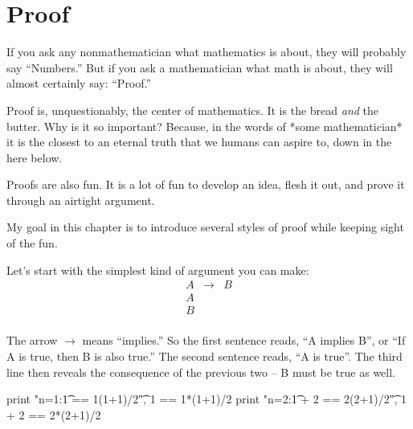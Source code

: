 \chapter{Proof}

If you ask any nonmathematician what mathematics is about, they will
probably say ``Numbers.''  But if you ask a mathematician what
math is about, they will almost certainly say: ``Proof.''

Proof is, unquestionably, the center of mathematics.  It is the bread
\emph{and} the butter.  Why is it so important?  Because, in the words
of *some mathematician* it is the closest to an eternal truth that we
humans can aspire to, down in the here below.

Proofs are also fun.  It is a lot of fun to develop an idea, flesh it
out, and prove it through an airtight argument.

My goal in this chapter is to introduce several styles of proof while
keeping sight of the fun.

Let's start with the simplest kind of argument you can make:
\begin{eqnarray}
 A & \longrightarrow & B \\
 A & & \\
 B & & \\
\end{eqnarray}

The arrow $\longrightarrow$ means ``implies.''  So the first sentence
reads, ``A implies B'', or ``If A is true, then B is also true.''  The
second sentence reads, ``A is true''.  The third line then reveals the
consequence of the previous two -- B must be true as well.

\begin{sageverbatim}
print "n=1:\t     1 == 1(1+1)/2\t", 1 == 1*(1+1)/2  
print "n=2:\t 1 + 2 == 2(2+1)/2\t", 1 + 2 == 2*(2+1)/2
\end{sageverbatim}




